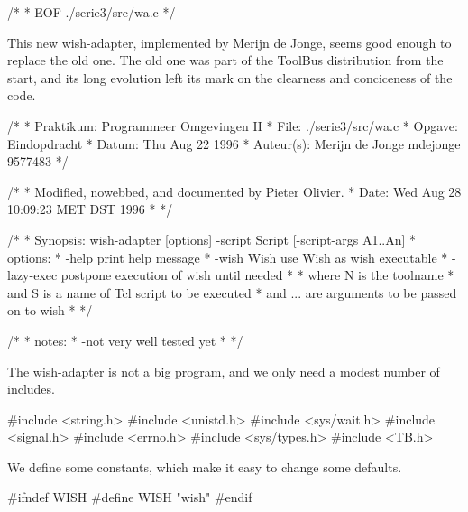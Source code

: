 /*
 * EOF ./serie3/src/wa.c
 */
\nwendcode{}\nwdocspar



This new wish-adapter, implemented by Merijn de Jonge, seems good
enough to replace the old one. The old one was part of the ToolBus
distribution from the start, and its long evolution left its mark
on the clearness and conciceness of the code.

\nwenddocs{}\endmoddef\let\nwnotused=\nwoutput{}
/*
 * Praktikum: Programmeer Omgevingen II
 * File:      ./serie3/src/wa.c
 * Opgave:    Eindopdracht
 * Datum:     Thu Aug 22 1996
 * Auteur(s): Merijn de Jonge   mdejonge   9577483
*/

/*
 * Modified, nowebbed, and documented by Pieter Olivier.
 * Date:     Wed Aug 28 10:09:23 MET DST 1996
 * 
 */

/*
 * Synopsis: wish-adapter [options] -script Script [-script-args A1..An]
 * options:
 *      -help                 print help message
 *      -wish Wish            use Wish as wish executable
 *      -lazy-exec            postpone execution of wish until needed
 * 
 * where N is the toolname
 * and   S is a name of Tcl script to be executed
 * and   ... are arguments to be passed on to wish
 * 
 */

/*
 * notes:
 *    -not very well tested yet
 *
 */
\nwendcode{}\nwdocspar


The wish-adapter is not a big program, and we only need a 
modest number of includes.

\nwenddocs{}\endmoddef\let\nwnotused=\nwoutput{}
#include <string.h>
#include <unistd.h>
#include <sys/wait.h>
#include <signal.h>
#include <errno.h>
#include <sys/types.h>
#include <TB.h>
\nwendcode{}\nwdocspar


We define some constants, which make it easy to change some defaults.

\nwenddocs{}\endmoddef\let\nwnotused=\nwoutput{}
#ifndef WISH
#define WISH    "wish"
#endif

